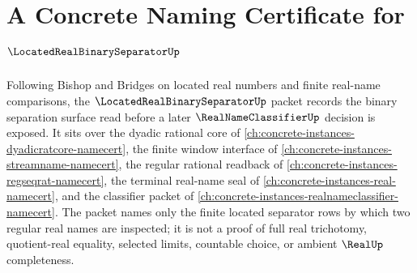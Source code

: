 \chapter{A Concrete Naming Certificate for $\LocatedRealBinarySeparatorUp$}
\label{ch:concrete-instances-located-real-binary-separator-namecert}

Following Bishop and Bridges on located real numbers and finite real-name comparisons, the $\LocatedRealBinarySeparatorUp$ packet records the binary separation surface read before a later $\RealNameClassifierUp$ decision is exposed. It sits over the dyadic rational core of \autoref{ch:concrete-instances-dyadicratcore-namecert}, the finite window interface of \autoref{ch:concrete-instances-streamname-namecert}, the regular rational readback of \autoref{ch:concrete-instances-regseqrat-namecert}, the terminal real-name seal of \autoref{ch:concrete-instances-real-namecert}, and the classifier packet of \autoref{ch:concrete-instances-realnameclassifier-namecert}. The packet names only the finite located separator rows by which two regular real names are inspected; it is not a proof of full real trichotomy, quotient-real equality, selected limits, countable choice, or ambient $\RealUp$ completeness.

